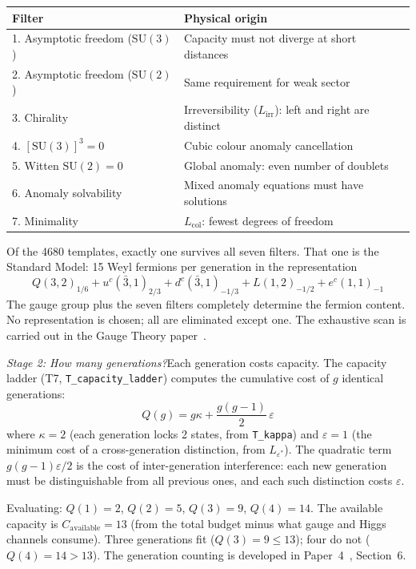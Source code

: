 \documentclass[11pt]{article}
\newcommand{\SU}{\mathrm{SU}}
\begin{document}
\smallskip
\begin{center}
\small
\begin{tabular}{ll}
\toprule
\textbf{Filter} & \textbf{Physical origin} \\
\midrule
1. Asymptotic freedom ($\SU(3)$) & Capacity must not diverge at short distances \\
2. Asymptotic freedom ($\SU(2)$) & Same requirement for weak sector \\
3. Chirality & Irreversibility ($L_{\mathrm{irr}}$): left and right are distinct \\
4. $[\SU(3)]^3 = 0$ & Cubic colour anomaly cancellation \\
5. Witten $\SU(2) = 0$ & Global anomaly: even number of doublets \\
6. Anomaly solvability & Mixed anomaly equations must have solutions \\
7. Minimality & $L_{\mathrm{col}}$: fewest degrees of freedom \\
\bottomrule
\end{tabular}
\end{center}
\smallskip

Of the 4680 templates, exactly one survives all seven filters.  That one is the Standard Model: 15 Weyl fermions per generation in the representation
\begin{equation}
Q(3,2)_{1/6} + u^c(\bar{3},1)_{2/3} + d^c(\bar{3},1)_{-1/3} + L(1,2)_{-1/2} + e^c(1,1)_{-1}
\end{equation}
The gauge group plus the seven filters completely determine the fermion content.  No representation is chosen; all are eliminated except one.  The exhaustive scan is carried out in the Gauge Theory paper~\cite{PGT}.

\textit{Stage 2: How many generations?}\quad Each generation costs capacity.  The capacity ladder (T7, \texttt{T\_capacity\_ladder}) computes the cumulative cost of $g$ identical generations:
\begin{equation}
Q(g) = g\kappa + \frac{g(g-1)}{2}\,\varepsilon
\end{equation}
where $\kappa = 2$ (each generation locks 2 states, from \texttt{T\_kappa}) and $\varepsilon = 1$ (the minimum cost of a cross-generation distinction, from $L_{\varepsilon^*}$).  The quadratic term $g(g-1)\varepsilon/2$ is the cost of inter-generation interference: each new generation must be distinguishable from all previous ones, and each such distinction costs $\varepsilon$.

Evaluating: $Q(1)=2$, $Q(2)=5$, $Q(3)=9$, $Q(4)=14$.  The available capacity is $C_{\mathrm{available}} = 13$ (from the total budget minus what gauge and Higgs channels consume).  Three generations fit ($Q(3) = 9 \le 13$); four do not ($Q(4) = 14 > 13$).  The generation counting is developed in Paper~4~\cite{P4}, Section~6.
\end{document}
